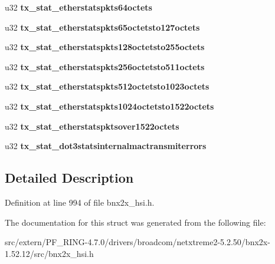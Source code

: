 \begin{DoxyCompactItemize}
\item 
\hypertarget{structemac__stats_a7bc0330a905e41dc4f9e6694c1a55282}{
u32 {\bfseries tx\_\-stat\_\-etherstatspkts64octets}}
\label{structemac__stats_a7bc0330a905e41dc4f9e6694c1a55282}

\item 
\hypertarget{structemac__stats_ae10714b7944f7dee3ff228d2a650f68d}{
u32 {\bfseries tx\_\-stat\_\-etherstatspkts65octetsto127octets}}
\label{structemac__stats_ae10714b7944f7dee3ff228d2a650f68d}

\item 
\hypertarget{structemac__stats_aecacecfab2ec4e088187f4c46112ca7b}{
u32 {\bfseries tx\_\-stat\_\-etherstatspkts128octetsto255octets}}
\label{structemac__stats_aecacecfab2ec4e088187f4c46112ca7b}

\item 
\hypertarget{structemac__stats_a3bd18026f50072d12c72ed923cb6c508}{
u32 {\bfseries tx\_\-stat\_\-etherstatspkts256octetsto511octets}}
\label{structemac__stats_a3bd18026f50072d12c72ed923cb6c508}

\item 
\hypertarget{structemac__stats_ae41fde86c8a130dd874df38f2ed05606}{
u32 {\bfseries tx\_\-stat\_\-etherstatspkts512octetsto1023octets}}
\label{structemac__stats_ae41fde86c8a130dd874df38f2ed05606}

\item 
\hypertarget{structemac__stats_a8e52b3c96c2d1206d5a66ab8390ad28c}{
u32 {\bfseries tx\_\-stat\_\-etherstatspkts1024octetsto1522octets}}
\label{structemac__stats_a8e52b3c96c2d1206d5a66ab8390ad28c}

\item 
\hypertarget{structemac__stats_aae17fecaa88e2fcb9fa7d20f0d3e0fdd}{
u32 {\bfseries tx\_\-stat\_\-etherstatspktsover1522octets}}
\label{structemac__stats_aae17fecaa88e2fcb9fa7d20f0d3e0fdd}

\item 
\hypertarget{structemac__stats_a291b37357dd6e6d527b4ce7cfa297e62}{
u32 {\bfseries tx\_\-stat\_\-dot3statsinternalmactransmiterrors}}
\label{structemac__stats_a291b37357dd6e6d527b4ce7cfa297e62}

\end{DoxyCompactItemize}


\subsection{Detailed Description}


Definition at line 994 of file bnx2x\_\-hsi.h.



The documentation for this struct was generated from the following file:\begin{DoxyCompactItemize}
\item 
src/extern/PF\_\-RING-\/4.7.0/drivers/broadcom/netxtreme2-\/5.2.50/bnx2x-\/1.52.12/src/bnx2x\_\-hsi.h\end{DoxyCompactItemize}
